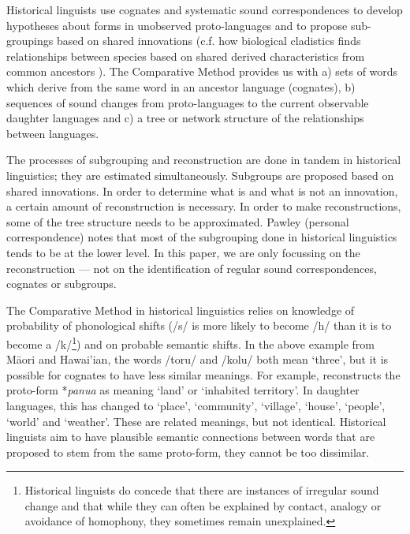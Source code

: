 \documentclass[a4paper,10pt]{article} %
\begin{document}

Historical linguists use cognates and systematic sound correspondences to develop hypotheses about forms in unobserved proto-languages and to propose sub-groupings based on shared innovations (c.f. how biological cladistics finds relationships between species based on shared derived characteristics from common ancestors \citep[16-17]{maclaurin2008biodiversity}). The Comparative Method provides us with a) sets of words which derive from the same word in an ancestor language (cognates), b) sequences of sound changes from proto-languages to the current observable daughter languages and c) a tree or network structure of the relationships between languages. 
 
The processes of subgrouping and reconstruction are done in tandem in historical linguistics; they are estimated simultaneously. Subgroups are proposed based on shared innovations. In order to determine what is and what is not an innovation, a certain amount of reconstruction is necessary. In order to make reconstructions, some of the tree structure needs to be approximated. Pawley (personal correspondence) notes that most of the subgrouping done in historical linguistics tends to be at the lower level. In this paper, we are only focussing on the reconstruction --- not on the identification of regular sound correspondences, cognates or subgroups.
 
The Comparative Method in historical linguistics relies on knowledge of probability of phonological shifts (/s/ is more likely to become /h/ than it is to become a /k/\footnote{Historical linguists do concede that there are instances of irregular sound change \citep{blust1996neogrammarian, campbell1996sound} and that while they can often be explained by contact, analogy or avoidance of homophony, they sometimes remain unexplained.}) and on probable semantic shifts. In the above example from M\={a}ori and Hawai'ian, the words /toru/ and /kolu/ both mean `three', but it is possible for cognates to have less similar meanings. For example, \citet{pawley2005meaning} reconstructs the proto-form *\emph{panua} as meaning `land' or `inhabited territory'. In daughter languages, this has changed to `place', `community', `village', `house', `people', `world' and `weather'. These are related meanings, but not identical. Historical linguists aim to have plausible semantic connections between words that are proposed to stem from the same proto-form, they cannot be too dissimilar.
\end{document}
